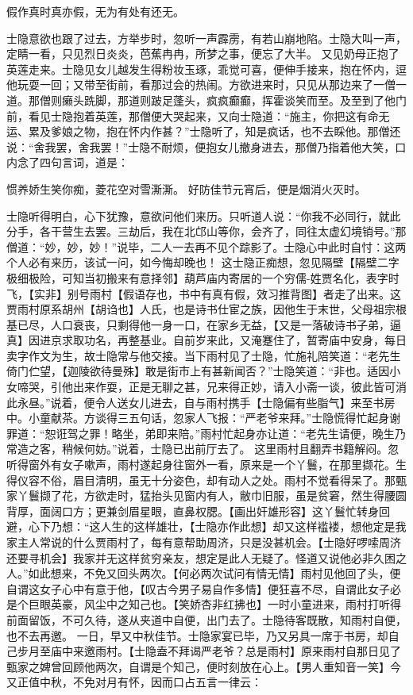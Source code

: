 \documentclass[12pt,oneside]{book}
\begin{document}
假作真时真亦假，无为有处有还无。

士隐意欲也跟了过去，方举步时，忽听一声霹雳，有若山崩地陷。士隐大叫一声，定睛一看，只见烈日炎炎，芭蕉冉冉，所梦之事，便忘了大半。
又见奶母正抱了英莲走来。士隐见女儿越发生得粉妆玉琢，乖觉可喜，便伸手接来，抱在怀内，逗他玩耍一回；又带至街前，看那过会的热闹。方欲进来时，只见从那边来了一僧一道。那僧则癞头跣脚，那道则跛足蓬头，疯疯癫癫，挥霍谈笑而至。及至到了他门前，看见士隐抱着英莲，那僧便大哭起来，又向士隐道：“施主，你把这有命无运、累及爹娘之物，抱在怀内作甚？”士隐听了，知是疯话，也不去睬他。那僧还说：“舍我罢，舍我罢！”士隐不耐烦，便抱女儿撤身进去，那僧乃指着他大笑，口内念了四句言词，道是：

惯养娇生笑你痴，菱花空对雪澌澌。
好防佳节元宵后，便是烟消火灭时。

士隐听得明白，心下犹豫，意欲问他们来历。只听道人说：“你我不必同行，就此分手，各干营生去罢。三劫后，我在北邙山等你，会齐了，同往太虚幻境销号。”那僧道：“妙，妙，妙！”说毕，二人一去再不见个踪影了。士隐心中此时自忖：这两个人必有来历，该试一问，如今悔却晚也！
这士隐正痴想，忽见隔壁【隔壁二字极细极险，可知当初搬来有意择邻】葫芦庙内寄居的一个穷儒-姓贾名化，表字时飞，【实非】别号雨村【假语存也，书中有真有假，效习推背图】者走了出来。这贾雨村原系胡州【胡诌也】人氏，也是诗书仕宦之族，因他生于末世，父母祖宗根基已尽，人口衰丧，只剩得他一身一口，在家乡无益，【又是一落破诗书子弟，逼真】因进京求取功名，再整基业。自前岁来此，又淹蹇住了，暂寄庙中安身，每日卖字作文为生，故士隐常与他交接。当下雨村见了士隐，忙施礼陪笑道：“老先生倚门伫望，【迦陵欲待曼殊】敢是街市上有甚新闻否？”士隐笑道：“非也。适因小女啼哭，引他出来作耍，正是无聊之甚，兄来得正妙，请入小斋一谈，彼此皆可消此永昼。”说着，便令人送女儿进去，自与雨村携手【士隐偏有些脂气】来至书房中。小童献茶。方谈得三五句话，忽家人飞报：“严老爷来拜。”士隐慌得忙起身谢罪道：“恕诳驾之罪！略坐，弟即来陪。”雨村忙起身亦让道：“老先生请便，晚生乃常造之客，稍候何妨。”说着，士隐已出前厅去了。
这里雨村且翻弄书籍解闷。忽听得窗外有女子嗽声，雨村遂起身往窗外一看，原来是一个丫鬟，在那里撷花。生得仪容不俗，眉目清明，虽无十分姿色，却有动人之处。雨村不觉看得呆了。那甄家丫鬟撷了花，方欲走时，猛抬头见窗内有人，敝巾旧服，虽是贫窘，然生得腰圆背厚，面阔口方；更兼剑眉星眼，直鼻权腮。【画出奸雄形容】这丫鬟忙转身回避，心下乃想：“这人生的这样雄壮，【士隐亦作此想】却又这样褴褛，想他定是我家主人常说的什么贾雨村了，每有意帮助周济，只是没甚机会。【士隐好啰嗦周济还要寻机会】我家并无这样贫穷亲友，想定是此人无疑了。怪道又说他必非久困之人。”如此想来，不免又回头两次。【何必两次试问有情无情】雨村见他回了头，便自谓这女子心中有意于他，【叹古今男子易自作多情】便狂喜不尽，自谓此女子必是个巨眼英豪，风尘中之知己也。【笑娇杏非红拂也】一时小童进来，雨村打听得前面留饭，不可久待，遂从夹道中自便，出门去了。士隐待客既散，知雨村自便，也不去再邀。
一日，早又中秋佳节。士隐家宴已毕，乃又另具一席于书房，却自己步月至庙中来邀雨村。【士隐盍不拜谒严老爷？总是雨村】原来雨村自那日见了甄家之婢曾回顾他两次，自谓是个知己，便时刻放在心上。【男人重知音一笑】今又正值中秋，不免对月有怀，因而口占五言一律云：
\end{document}
